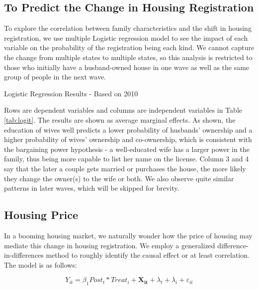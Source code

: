 \documentclass[11pt]{article}
\begin{document}
\subsection{To Predict the Change in Housing Registration}

To explore the correlation between family characteristics and the shift in housing registration, we use multiple Logistic regression model to see the impact of each variable on the probability of the registration being each kind. We cannot capture the change from multiple states to multiple states, so this analysis is restricted to those who initially have a husband-owned house in one wave as well as the same group of people in the next wave. 

\begin{table}[h]
    \centering
    
    \caption{Logistic Regression Results - Based on 2010}
    \label{tab:logit}

\end{table}

Rows are dependent variables and columns are independent variables in Table \ref{tab:logit}. The results are shown as average marginal effects. As shown, the education of wives well predicts a lower probability of husbands' ownership and a higher probability of wives' ownership and co-ownership, which is consistent with the bargaining power hypothesis - a well-educated wife has a larger power in the family, thus being more capable to list her name on the license. Column 3 and 4 say that the later a couple gets married or purchases the house, the more likely they change the owner(s) to the wife or both. We also observe quite similar patterns in later waves, which will be skipped for brevity.



\subsection{Housing Price}

In a booming housing market, we naturally wonder how the price of housing may mediate this change in housing registration. We employ a generalized difference-in-differences method to roughly identify the causal effect or at least correlation. The model is as follows:

\begin{equation*}
    Y_{it} = \beta_1 Post_{t}* Treat_{i} + \mathbf{X_{it}} + \lambda_t + \lambda_i + \varepsilon_{it}
\end{equation*}
\end{document}

